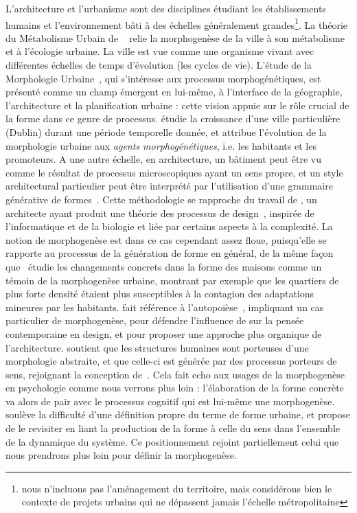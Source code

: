 {L'architecture et l'urbanisme sont des disciplines étudiant les établissements humains et l'environnement bâti à des échelles généralement grandes\footnote{nous n'incluons pas l'aménagement du territoire, mais considérons bien le contexte de projets urbains qui ne dépassent jamais l'échelle métropolitaine}. La théorie du Métabolisme Urbain de ~\cite{olsen1982urban} relie la morphogenèse de la ville à son métabolisme et à l'écologie urbaine. La ville est vue comme une organisme vivant avec différentes échelles de temps d'évolution (les cycles de vie). L'étude de la Morphologie Urbaine~\cite{moudon1997urban}, qui s'intéresse aux processus morphogénétiques, est présenté comme un champ émergent en lui-même, à l'interface de la géographie, l'architecture et la planification urbaine : cette vision appuie sur le rôle crucial de la forme dans ce genre de processus. \cite{burke1972dublin} étudie la croissance d'une ville particulière (Dublin) durant une période temporelle donnée, et attribue l'évolution de la morphologie urbaine aux \emph{agents morphogénétiques}, i.e. les habitants et les promoteurs. A une autre échelle, en architecture, un bâtiment peut être vu comme le résultat de processus microscopiques ayant un sens propre, et un style architectural particulier peut être interprété par l'utilisation d'une grammaire générative de formes~\cite{ceccarini2001essai}. Cette méthodologie se rapproche du travail de , un architecte ayant produit une théorie des processus de design~\cite{mehaffy2007notes}, inspirée de l'informatique et de la biologie et liée par certains aspects à la complexité. La notion de morphogenèse est dans ce cas cependant assez floue, puisqu'elle se rapporte au processus de la génération de forme en général, de la même façon que~\cite{whitehand1999urban} étudie les changements concrets dans la forme des maisons comme un témoin de la morphogenèse urbaine, montrant par exemple que les quartiers de plus forte densité étaient plus susceptibles à la contagion des adaptations mineures par les habitants.  fait référence à l'autopoièse~\cite{dollens2014alan}, impliquant un cas particulier de morphogenèse, pour défendre l'influence de  sur la pensée contemporaine en design, et pour proposer une approche plus organique de l'architecture. \cite{desmarais1992premisses} soutient que les structures humaines sont porteuses d'une morphologie abstraite, et que celle-ci est générée par des processus porteurs de sens, rejoignant la conception de~\cite{ceccarini2001essai}. Cela fait echo aux usages de la morphogenèse en psychologie comme nous verrons plus loin : l'élaboration de la forme concrète va alors de pair avec le processus cognitif qui est lui-même une morphogenèse. \cite{levy2005formes} soulève la difficulté d'une définition propre du terme de forme urbaine, et propose de le revisiter en liant la production de la forme à celle du sens dans l'ensemble de la dynamique du système. Ce positionnement rejoint partiellement celui que nous prendrons plus loin pour définir la morphogenèse.
}





